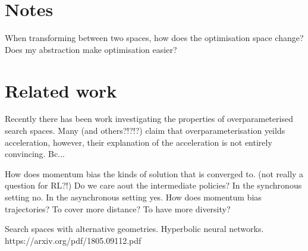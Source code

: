 \section{Notes}

When transforming between two spaces, how does the optimisation space
change? Does my abstraction make optimisation easier?


\section{Related work}

Recently there has been work investigating the properties of overparameterised search spaces.
Many \cite{Arora2018} (and others?!?!?) claim that overparameterisation yeilds acceleration, however,
their explanation of the acceleration is not entirely convincing. Bc...

How does momentum bias the kinds of solution that is converged to. (not really a question for RL?!)
Do we care aout the intermediate policies? In the synchronous setting no. In the asynchronous setting yes.
How does momentum bias trajectories? To cover more distance? To have more diversity?

Search spaces with alternative geometries.
Hyperbolic neural networks. https://arxiv.org/pdf/1805.09112.pdf
